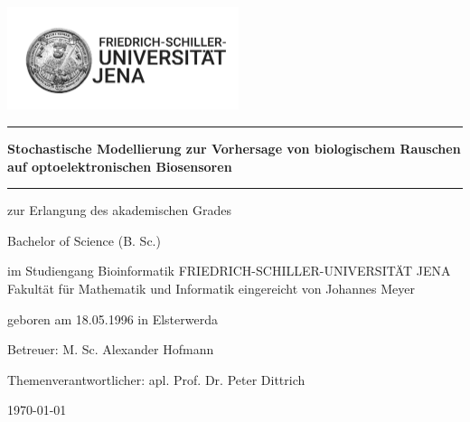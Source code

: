 \begin{titlepage}
	\thispagestyle{empty}
	\newcommand{\Rule}{\rule{\textwidth}{1mm}}
	\begin{center}
		\includegraphics[height=30mm]{./Bilder/HanfriedLogo}
		\Rule \vspace{5mm}
		\onehalfspacing \LARGE \textbf{Stochastische Modellierung zur Vorhersage von biologischem Rauschen auf optoelektronischen Biosensoren}
		\vspace{1mm} \Rule
		\vfill
		\textbf{}\par
		zur Erlangung des akademischen Grades\par
		Bachelor of Science (B. Sc.)\par
		im Studiengang Bioinformatik
		\vfill
		\LARGE \doublespacing FRIEDRICH-SCHILLER-UNIVERSITÄT JENA\newline
		\large Fakultät für Mathematik und Informatik
		\vfill \singlespacing
		eingereicht von Johannes Meyer\par
		geboren am 18.05.1996 in Elsterwerda\par
		\vfill
		Betreuer: M. Sc. Alexander Hofmann\par
		Themenverantwortlicher: apl. Prof. Dr. Peter Dittrich\par
		\vfill
		\today  %
	\end{center}
\end{titlepage}